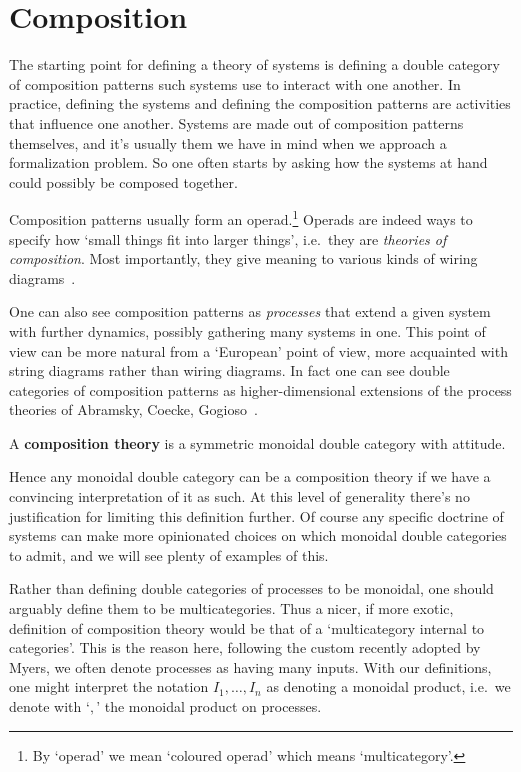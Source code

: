 \section{Composition}
The starting point for defining a theory of systems is defining a double category of composition patterns such systems use to interact with one another.
In practice, defining the systems and defining the composition patterns are activities that influence one another.
Systems are made out of composition patterns themselves, and it's usually them we have in mind when we approach a formalization problem.
So one often starts by asking how the systems at hand could possibly be composed together.

Composition patterns usually form an operad.\footnote{By `operad' we mean `coloured operad' which means `multicategory'.}
Operads are indeed ways to specify how `small things fit into larger things', i.e.~they are \emph{theories of composition}.
Most importantly, they give meaning to various kinds of wiring diagrams~\cite{spivak2013operad,vagner2014algebras, libkind2021operadic}.

One can also see composition patterns as \emph{processes} that extend a given system with further dynamics, possibly gathering many systems in one.
This point of view can be more natural from a `European' point of view, more acquainted with string diagrams rather than wiring diagrams.
In fact one can see double categories of composition patterns as higher-dimensional extensions of the process theories of Abramsky, Coecke, Gogioso~\cite{abramsky2004categorical, coecke2018picturing}.

\begin{definition}
	A \textbf{composition theory} is a symmetric monoidal double category with attitude.
\end{definition}

Hence any monoidal double category can be a composition theory if we have a convincing interpretation of it as such.
At this level of generality there's no justification for limiting this definition further.
Of course any specific doctrine of systems can make more opinionated choices on which monoidal double categories to admit, and we will see plenty of examples of this.

\begin{remark}
	Rather than defining double categories of processes to be monoidal, one should arguably define them to be multicategories.
	Thus a nicer, if more exotic, definition of composition theory would be that of a `multicategory internal to categories'.
	This is the reason here, following the custom recently adopted by Myers, we often denote processes as having many inputs.
	With our definitions, one might interpret the notation $I_1, \ldots, I_n$ as denoting a monoidal product, i.e.~we denote with `$, $' the monoidal product on processes.
\end{remark}

